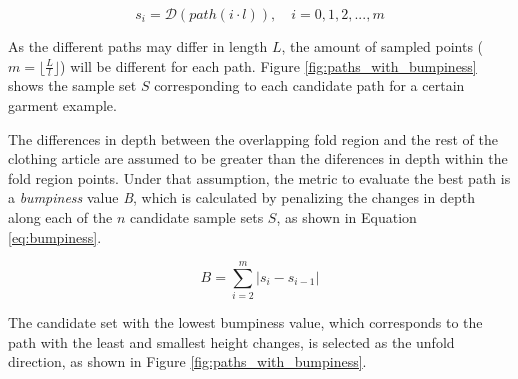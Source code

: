 \begin{equation}
s_i = \mathcal{D}(path(i \cdot l)), \quad  i=0,1,2,..., m
\end{equation}

As the different paths may differ in length $L$, the amount of sampled points ($m=${\Large$\lfloor\frac{L}{l}\rfloor$}) will be different for each path. Figure \ref{fig:paths_with_bumpiness} shows the sample set $S$ corresponding to each candidate path for a certain garment example.

The differences in depth between the overlapping fold region and the rest of the clothing article are assumed to be greater than the diferences in depth within the fold region points. Under that assumption, the metric to evaluate the best path is a \textit{bumpiness} value \textit{B}, which is calculated by penalizing the changes in depth along each of the $n$ candidate sample sets $S$, as shown in Equation \ref{eq:bumpiness}.

\begin{equation}\label{eq:bumpiness}
B = \sum_{i=2}^{m} | s_i- s_{i-1} | 
\end{equation}

The candidate set with the lowest bumpiness value, which corresponds to the path with the least and smallest height changes, is selected as the unfold direction, as shown in Figure \ref{fig:paths_with_bumpiness}.

